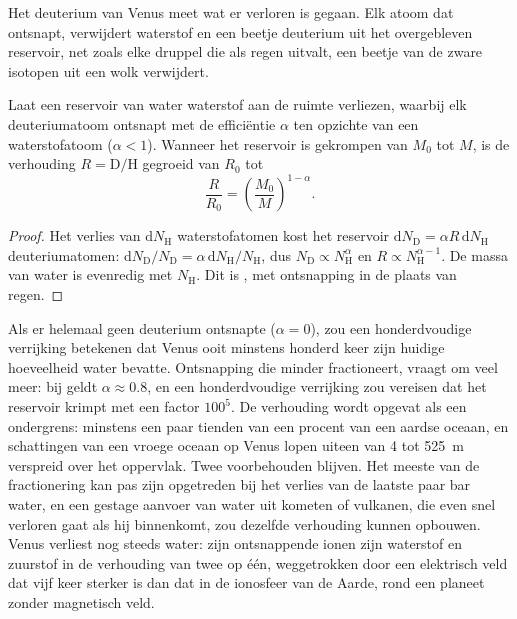 Het deuterium van Venus meet wat er verloren is gegaan. Elk atoom dat ontsnapt,
verwijdert waterstof en een beetje deuterium uit het overgebleven reservoir, net zoals
elke druppel die als regen uitvalt, een beetje van de zware isotopen uit een
wolk verwijdert.

\begin{proposition}\label{prop:b3:planetary-atmospheres:dh}
Laat een reservoir van water waterstof aan de ruimte verliezen, waarbij elk deuteriumatoom
ontsnapt met de efficiëntie $\alpha$ ten opzichte van een waterstofatoom ($\alpha < 1$).
Wanneer het reservoir is gekrompen van $M_0$ tot $M$, is de verhouding
$R = \mathrm{D}/\mathrm{H}$ gegroeid van $R_0$ tot
\[
\frac R{R_0} = \left(\frac{M_0}M\right)^{1-\alpha}.
\]
\end{proposition}

\begin{proof}
Het verlies van $\mathrm dN_\mathrm H$ waterstofatomen kost het reservoir
$\mathrm dN_\mathrm D = \alpha R\,\mathrm dN_\mathrm H$ deuteriumatomen:
$\mathrm dN_\mathrm D/N_\mathrm D = \alpha\,\mathrm dN_\mathrm H/
N_\mathrm H$, dus $N_\mathrm D \propto N_\mathrm H^\alpha$ en $R \propto
N_\mathrm H^{\alpha - 1}$. De massa van water is evenredig met
$N_\mathrm H$. Dit is , met ontsnapping in de plaats van
regen.
\end{proof}

Als er helemaal geen deuterium ontsnapte ($\alpha = 0$), zou een honderdvoudige verrijking
betekenen dat Venus ooit minstens honderd keer zijn huidige hoeveelheid water
bevatte. Ontsnapping die minder fractioneert, vraagt om veel meer: bij  geldt $\alpha \approx 0.8$, en een honderdvoudige verrijking zou vereisen dat
het reservoir krimpt met een factor $100^5$. De verhouding wordt opgevat als een
ondergrens: minstens een paar tienden van een procent van een aardse oceaan,
en schattingen van een vroege oceaan op Venus lopen uiteen van 4 tot \qty{525}{m} verspreid
over het oppervlak. Twee voorbehouden blijven. Het meeste van de fractionering kan
pas zijn opgetreden bij het verlies van de laatste paar bar water, en een gestage
aanvoer van water uit kometen of vulkanen, die even snel verloren gaat als hij binnenkomt, zou
dezelfde verhouding kunnen opbouwen. Venus verliest nog steeds water: zijn ontsnappende ionen zijn
waterstof en zuurstof in de verhouding van twee op één, weggetrokken door een elektrisch veld
dat vijf keer sterker is dan dat in de ionosfeer van de Aarde, rond een
planeet zonder magnetisch veld.

